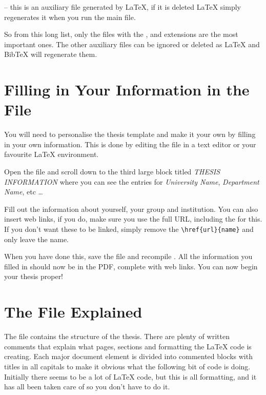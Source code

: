  -- this is an auxiliary file generated by \LaTeX{}, if it is deleted \LaTeX{} simply regenerates it when you run the main  file.

So from this long list, only the files with the ,  and  extensions are the most important ones.
The other auxiliary files can be ignored or deleted as \LaTeX{} and BibTeX will regenerate them.


\section{Filling in Your Information in the  File}\label{FillingFile}

You will need to personalise the thesis template and make it your own by filling in your own information.
This is done by editing the  file in a text editor or your favourite LaTeX environment.

Open the file and scroll down to the third large block titled \emph{THESIS INFORMATION} where you can see the entries for \emph{University Name}, \emph{Department Name}, etc \ldots

Fill out the information about yourself, your group and institution.
You can also insert web links, if you do, make sure you use the full URL, including the  for this.
If you don't want these to be linked, simply remove the \verb|\href{url}{name}| and only leave the name.

When you have done this, save the file and recompile .
All the information you filled in should now be in the PDF, complete with web links.
You can now begin your thesis proper!


\section{The  File Explained}

The  file contains the structure of the thesis.
There are plenty of written comments that explain what pages, sections and formatting the \LaTeX{} code is creating.
Each major document element is divided into commented blocks with titles in all capitals to make it obvious what the following bit of code is doing.
Initially there seems to be a lot of \LaTeX{} code, but this is all formatting, and it has all been taken care of so you don't have to do it.


